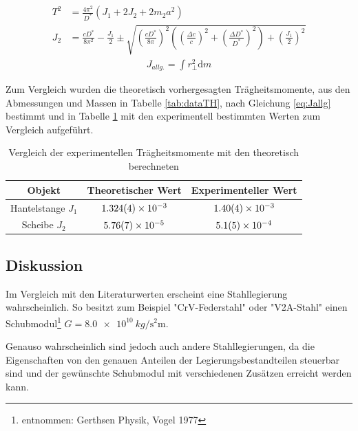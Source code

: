 \begin{align}
		T^2&= \frac{4 \pi^2}{D^*}(J_1+2J_2+2m_2 a^2)
	\label{eq:hantelta}\\
J_2&=\frac{c D^*}{8 \pi ^2}-\frac{J_1}{2} \pm \sqrt{\left( \frac{c D^*}{8 \pi}\right) ^2\left( \left( \frac{\Delta c}{c}\right) ^2+  \left( \frac{\Delta D^*}{D^*}\right) ^2\right) + \left(\frac{J_1}{2}\right)^2 }\label{eq:hantelJ2}
\end{align}
\begin{align}
	J_{allg.}=\int r_{\perp}^2 \textrm{d}m
	\label{eq:Jallg}
\end{align}

Zum Vergleich wurden die theoretisch vorhergesagten Trägheitsmomente, aus den Abmessungen und Massen in Tabelle \ref{tab:dataTH}, nach Gleichung \ref{eq:Jallg} bestimmt und in Tabelle \ref{tab:vglJ} mit den experimentell bestimmten Werten zum Vergleich aufgeführt. 

\begin{table}[h!]
	\caption{Vergleich der experimentellen Trägheitsmomente mit den theoretisch berechneten}
	\begin{tabular}{|c|c|c|}
		\hline 
		Objekt &Theoretischer Wert	& Experimenteller Wert  \\ 
		\hline 
		Hantelstange $J_1$ &$\SI{1.324\pm 0.004 e-3}{}$	& $\SI{1.40\pm 0.04e-3}{}$ \\ 
		\hline 
		Scheibe $J_2$&  $\SI{5.76\pm 0.07e-5}{}$	&$\SI{5.1 \pm 0.5  e-04}{}$ \\ 
		\hline 
	\end{tabular} 
	\label{tab:vglJ}
\end{table}








\subsection{Diskussion}
\label{sec:disc:pendel}

Im Vergleich mit den Literaturwerten erscheint eine Stahllegierung wahrscheinlich. So besitzt zum Beispiel "CrV-Federstahl" oder "V2A-Stahl" einen Schubmodul\footnote{entnommen: Gerthsen Physik, Vogel 1977} $G=\SI{8.0 e10}{kg \per  \second \squared \metre}$.

Genauso wahrscheinlich sind jedoch auch andere Stahllegierungen, da die Eigenschaften von den genauen Anteilen der Legierungsbestandteilen steuerbar sind und der gewünschte Schubmodul mit verschiedenen Zusätzen erreicht werden kann.\\

